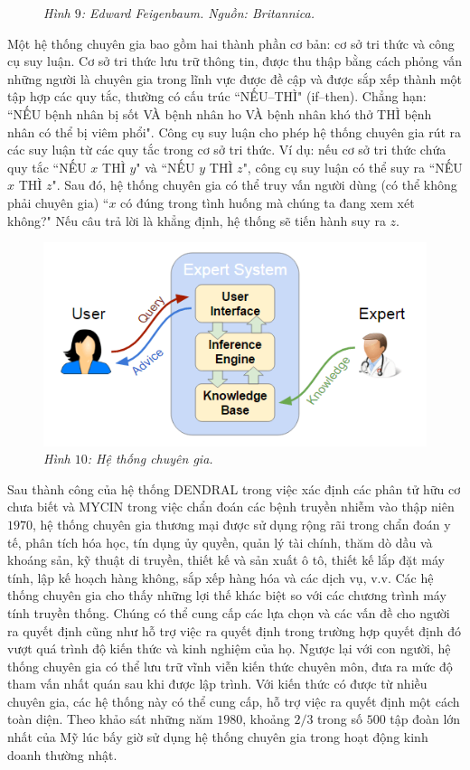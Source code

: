 \begin{multicols}{2}
\begin{figure}[H]
		\caption{\small\textit{\color{cackithi}Hình $9$: Edward Feigenbaum. Nguồn: Britannica.}}
		\vspace*{-10pt}
	\end{figure}
	Một hệ thống chuyên gia bao gồm hai thành phần cơ bản: cơ sở tri thức và công cụ suy luận. Cơ sở tri thức lưu trữ thông tin, được thu thập bằng cách phỏng vấn những người là chuyên gia trong lĩnh vực được đề cập và được sắp xếp thành một tập hợp các quy tắc, thường có cấu trúc ``NẾU--THÌ" (if--then). Chẳng hạn: ``NẾU bệnh nhân bị sốt VÀ bệnh nhân ho VÀ bệnh nhân khó thở THÌ bệnh nhân có thể bị viêm phổi". Công cụ suy luận cho phép hệ thống chuyên gia rút ra các suy luận từ các quy tắc trong cơ sở tri thức. Ví dụ: nếu cơ sở tri thức chứa quy tắc ``NẾU $x$ THÌ $y$" và ``NẾU $y$ THÌ $z$", công cụ suy luận có thể suy ra ``NẾU $x$ THÌ $z$". Sau đó, hệ thống chuyên gia có thể truy vấn người dùng (có thể không phải chuyên gia) ``$x$ có đúng trong tình huống mà chúng ta đang xem xét không?" Nếu câu trả lời là khẳng định, hệ thống sẽ tiến hành suy ra $z$.
	\begin{figure}[H]
		\vspace*{-5pt}
		\centering
		\captionsetup{labelformat= empty, justification=centering}
		\includegraphics[width= 0.9\linewidth]{Expert_System.png}
		\caption{\small\textit{\color{cackithi}Hình $10$: Hệ thống chuyên gia.}}
		\vspace*{-10pt}
	\end{figure}
	Sau thành công của hệ thống DENDRAL trong việc xác định các phân tử hữu cơ chưa biết và MYCIN trong việc chẩn đoán các bệnh truyền nhiễm vào thập niên $1970$, hệ thống chuyên gia thương mại được sử dụng rộng rãi trong chẩn đoán y tế, phân tích hóa học, tín dụng ủy quyền, quản lý tài chính, thăm dò dầu và khoáng sản, kỹ thuật di truyền, thiết kế và sản xuất ô tô, thiết kế lắp đặt máy tính, lập kế hoạch hàng không, sắp xếp hàng hóa và các dịch vụ, v.v. Các hệ thống chuyên gia cho thấy những lợi thế khác biệt so với các chương trình máy tính truyền thống. Chúng có thể  cung cấp các lựa chọn và các vấn đề cho người ra quyết định cũng như hỗ trợ việc ra quyết định trong trường hợp quyết định đó vượt quá trình độ kiến thức và kinh nghiệm của họ. Ngược lại với con người, hệ thống chuyên gia có thể  lưu trữ vĩnh viễn kiến thức chuyên môn, đưa ra mức độ tham vấn nhất quán sau khi được lập trình. Với kiến thức có được từ nhiều chuyên gia, các hệ thống này có thể cung cấp, hỗ trợ việc ra quyết định một cách toàn diện. Theo khảo sát những năm $1980$, khoảng $2/3$ trong số $500$ tập đoàn lớn nhất của Mỹ lúc bấy giờ sử dụng hệ thống chuyên gia trong hoạt động kinh doanh thường nhật.

\end{multicols}
